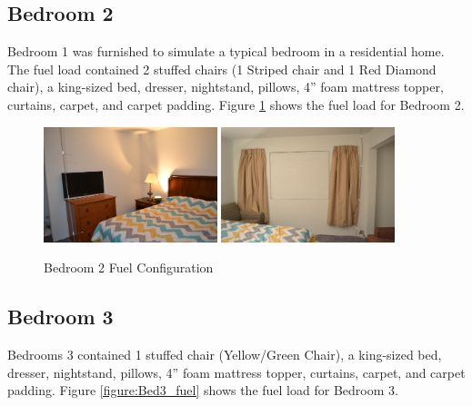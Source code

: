 \documentclass[12pt,oneside]{book}
\begin{document}
\subsection*{Bedroom 2}
Bedroom 1 was furnished to simulate a typical bedroom in a residential home. The fuel load contained 2 stuffed chairs (1 Striped chair and 1 Red Diamond chair), a king-sized bed, dresser, nightstand, pillows, 4'' foam mattress topper, curtains, carpet, and carpet padding. Figure \ref{figure:Bed2_fuel} shows the fuel load for Bedroom 2.

\begin{figure}[H]
\centering
\includegraphics[width=0.45\textwidth]{../0_Images/Fuel/Bedroom_2_1.jpg}
\includegraphics[width=0.45\textwidth]{../0_Images/Fuel/Bedroom_2_2.jpg}
\caption{Bedroom 2 Fuel Configuration}
\label{figure:Bed2_fuel}
\end{figure}

\subsection*{Bedroom 3}
Bedrooms 3 contained 1 stuffed chair (Yellow/Green Chair), a king-sized bed, dresser, nightstand, pillows, 4'' foam mattress topper, curtains, carpet, and carpet padding. Figure \ref{figure:Bed3_fuel} shows the fuel load for Bedroom 3.
\end{document}
